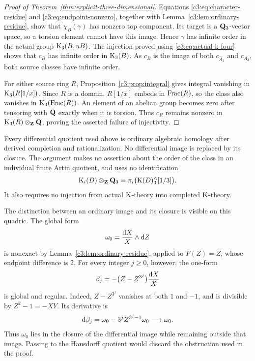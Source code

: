 \begin{proof}[Proof of Theorem~\ref{thm:explicit-three-dimensional}]
Equations \eqref{c3:eq:character-residue} and
\eqref{c3:eq:endpoint-nonzero}, together with
Lemma~\ref{c3:lem:ordinary-residue}, show that
$\chi_B(\gamma)$ has nonzero top component.
Its target is a $\mathbf{Q}_3$-vector space, so a torsion element cannot have
this image.
Hence $\gamma$ has infinite order in the actual group
$\operatorname{K}_3(B,uB)$.
The injection proved using \eqref{c3:eq:actual-k-four} shows that $c_B$
has infinite order in $\operatorname{K}_3(B)$.
As $c_B$ is the image of both $c_{\widehat A_3}$ and $c_{A_3}$, both
source classes have infinite order.

For either source ring $R$, Proposition~\ref{c3:prop:integral} gives
integral vanishing in $\operatorname{K}_3(R[1/x])$.
Since $R$ is a domain, $R[1/x]$ embeds in $\operatorname{Frac}(R)$, so the class
also vanishes in $\operatorname{K}_3(\operatorname{Frac}(R))$.
An element of an abelian group becomes zero after tensoring with
$\mathbf{Q}$ exactly when it is torsion.
Thus $c_R$ remains nonzero in $\operatorname{K}_3(R)\otimes_{\mathbf{Z}}\mathbf{Q}$, proving the
asserted failure of injectivity.
\end{proof}

\begin{remark}
\label{c3:rem:ordinary-homology}
Every differential quotient used above is ordinary algebraic homology
after derived completion and rationalization.
No differential image is replaced by its closure.
The argument makes no assertion about the order of the class in an
individual finite Artin quotient, and uses no identification
\[
 \operatorname{K}_i(D)\otimes_{\mathbf{Z}}\mathbf{Q}_3
   =\pi_i\bigl(\operatorname{K}(D)^\wedge_3[1/3]\bigr).
\]
It also requires no injection from actual $\operatorname{K}$-theory into completed
$\operatorname{K}$-theory.

The distinction between an ordinary image and its closure is visible
on this quadric.
The global form
\[
 \omega_0=\frac{\mathrm{d} X}{X}\wedge\mathrm{d} Z
\]
is nonexact by Lemma~\ref{c3:lem:ordinary-residue}, applied to $F(Z)=Z$,
whose endpoint difference is $2$.
For every integer $j\geq0$, however, the one-form
\[
 \beta_j=-\bigl(Z-Z^{3^j}\bigr)\frac{\mathrm{d} X}{X}
\]
is global and regular.
Indeed, $Z-Z^{3^j}$ vanishes at both $1$ and $-1$, and is divisible
by $Z^2-1=-XY$.
Its derivative is
\[
 \mathrm{d}\beta_j
    =\omega_0-3^jZ^{3^j-1}\omega_0
    \longrightarrow\omega_0.
\]
Thus $\omega_0$ lies in the closure of the differential image while
remaining outside that image.
Passing to the Hausdorff quotient would discard the obstruction used
in the proof.
\end{remark}
